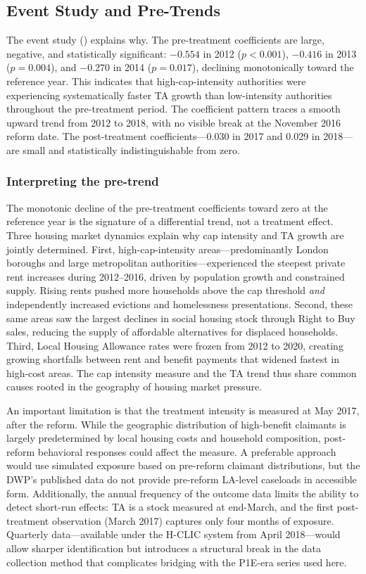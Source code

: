 \documentclass[12pt]{article}
\begin{document}
\subsection{Event Study and Pre-Trends}



The event study () explains why. The pre-treatment coefficients are large, negative, and statistically significant: $-0.554$ in 2012 ($p < 0.001$), $-0.416$ in 2013 ($p = 0.004$), and $-0.270$ in 2014 ($p = 0.017$), declining monotonically toward the reference year. This indicates that high-cap-intensity authorities were experiencing systematically faster TA growth than low-intensity authorities throughout the pre-treatment period. The coefficient pattern traces a smooth upward trend from 2012 to 2018, with no visible break at the November 2016 reform date. The post-treatment coefficients---0.030 in 2017 and 0.029 in 2018---are small and statistically indistinguishable from zero.

\subsubsection*{Interpreting the pre-trend} The monotonic decline of the pre-treatment coefficients toward zero at the reference year is the signature of a differential trend, not a treatment effect. Three housing market dynamics explain why cap intensity and TA growth are jointly determined. First, high-cap-intensity areas---predominantly London boroughs and large metropolitan authorities---experienced the steepest private rent increases during 2012--2016, driven by population growth and constrained supply. Rising rents pushed more households above the cap threshold \textit{and} independently increased evictions and homelessness presentations. Second, these same areas saw the largest declines in social housing stock through Right to Buy sales, reducing the supply of affordable alternatives for displaced households. Third, Local Housing Allowance rates were frozen from 2012 to 2020, creating growing shortfalls between rent and benefit payments that widened fastest in high-cost areas. The cap intensity measure and the TA trend thus share common causes rooted in the geography of housing market pressure.

An important limitation is that the treatment intensity is measured at May 2017, after the reform. While the geographic distribution of high-benefit claimants is largely predetermined by local housing costs and household composition, post-reform behavioral responses could affect the measure. A preferable approach would use simulated exposure based on pre-reform claimant distributions, but the DWP's published data do not provide pre-reform LA-level caseloads in accessible form. Additionally, the annual frequency of the outcome data limits the ability to detect short-run effects: TA is a stock measured at end-March, and the first post-treatment observation (March 2017) captures only four months of exposure. Quarterly data---available under the H-CLIC system from April 2018---would allow sharper identification but introduces a structural break in the data collection method that complicates bridging with the P1E-era series used here.
\end{document}
